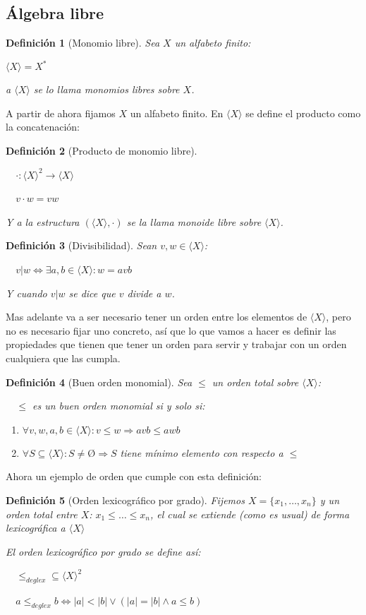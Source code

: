 \documentclass{amsbook}
\theoremstyle{customstyle}
\newtheorem{definition}{Definición}[section]
\begin{document}
\subsection{Álgebra libre}

\begin{definition}[Monomio libre]
Sea $X$ un alfabeto finito:

$⟨X⟩ = X^*$

a $⟨X⟩$ se lo llama monomios libres sobre $X$.
\end{definition}

A partir de ahora fijamos $X$ un alfabeto finito. En $⟨X⟩$ se define el producto como la concatenación:

\begin{definition}[Producto de monomio libre]\

  $· : ⟨X⟩^2 → ⟨X⟩$

  $v · w = vw$

Y a la estructura $(⟨X⟩, ·)$ se la llama monoide libre sobre $⟨X⟩$.
\end{definition}

\begin{definition}[Divisibilidad]
Sean $v, w ∈ ⟨X⟩$:

  $v | w ⇔ ∃a , b ∈ ⟨X⟩ : w = avb$

Y cuando $v | w$ se dice que $v$ divide a $w$.
\end{definition}

Mas adelante va a ser necesario tener un orden entre los elementos de $⟨X⟩$, pero no es necesario fijar uno concreto, así que lo que vamos a hacer es definir las propiedades que tienen que tener un orden para servir y trabajar con un orden cualquiera que las cumpla.

\begin{definition}[Buen orden monomial]
Sea $≤$ un orden total sobre $⟨X⟩$:

  $≤$ es un buen orden monomial si y solo si:
\begin{enumerate}[label = (\alph*)]
\item $∀v, w, a, b ∈ ⟨X⟩ : v ≤ w ⇒ avb ≤ awb$

\item $∀S ⊆ ⟨X⟩ : S ≠ Ø ⇒ S$ tiene mínimo elemento con respecto a $≤$
\end{enumerate}
\end{definition}

Ahora un ejemplo de orden que cumple con esta definición:

\begin{definition}[Orden lexicográfico por grado]
Fijemos $X = \{x_1, …, x_n\}$ y un orden total entre $X$: $x_1 ≤ … ≤ x_n$, el cual se extiende (como es usual) de forma lexicográfica a $⟨X⟩$

El orden lexicográfico por grado se define así:

  $≤_{deglex} ⊆ ⟨X⟩^2$

  $a ≤_{deglex} b ⇔ |a| < |b| ∨ (|a| = |b| ∧ a ≤ b)$
\end{definition}
\end{document}
